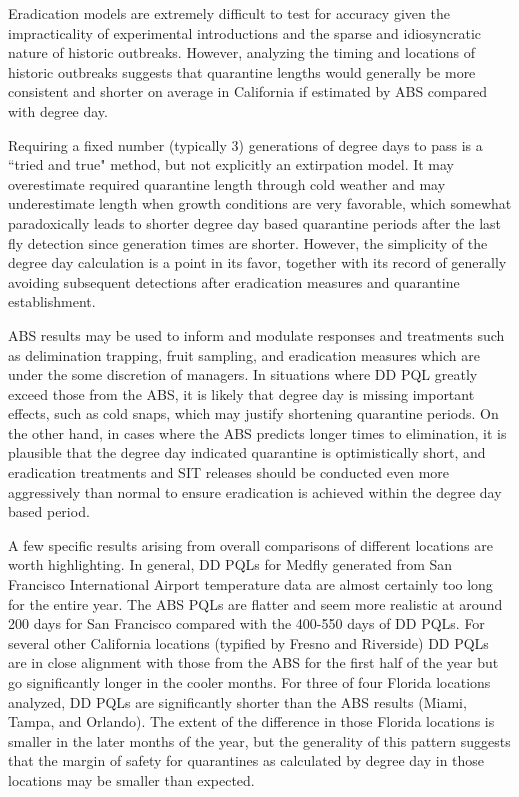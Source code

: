 \documentclass[10pt,a4paper,twocolumn]{article}
\begin{document}

Eradication models are extremely difficult to test for accuracy given 
the impracticality of experimental introductions and 
the sparse and idiosyncratic nature of historic outbreaks.
However, analyzing the timing and locations of historic outbreaks 
suggests that quarantine lengths would generally be more consistent
and shorter on average in California if estimated by ABS compared with degree day. 

Requiring a fixed number (typically 3) generations of degree days to pass is 
a ``tried and true" method, but not explicitly an extirpation model.
It may overestimate required quarantine length through cold weather\cite{manoukis_agent-based_2014}
and may underestimate length when growth conditions are very favorable, 
which somewhat paradoxically leads to shorter degree day based quarantine periods after the 
last fly detection since generation times are shorter. %
However, the simplicity of the degree day calculation is a point in its favor, together with 
its record of generally avoiding subsequent detections after
eradication measures and quarantine establishment\cite{mcinnis2017can}.

ABS results may be used to inform and modulate responses and treatments such as
delimination trapping, fruit sampling, and eradication measures which are under
the some discretion of managers.
In situations where DD PQL greatly exceed those from the ABS, it is likely
that degree day is missing important effects, such as cold snaps, which may justify
shortening quarantine periods.
On the other hand, in cases where the ABS predicts longer times to elimination, it
is plausible that the degree day indicated quarantine is optimistically short, and 
eradication treatments and SIT releases should be conducted even more aggressively than
normal to ensure eradication is achieved within the degree day based period. %


A few specific results arising from overall comparisons of different locations are worth highlighting. 
In general, DD PQLs for Medfly 
generated from San Francisco International Airport temperature data
 are almost certainly too long for the entire year.
The ABS PQLs are flatter and seem more realistic at around 200 days for San
Francisco compared with the 400-550 days of DD PQLs. 
For several other California locations (typified by Fresno and 
Riverside) DD PQLs are in close alignment with those from the ABS 
for the first half of the year 
but go significantly longer in the cooler months. 
For three of four Florida locations analyzed, 
DD PQLs are significantly shorter than the ABS results
 (Miami, Tampa, and Orlando).
The extent of the difference in those Florida locations is smaller in the later months of the year,
but the generality of this pattern suggests that the margin of safety for quarantines as 
calculated by degree day in those locations may be smaller than expected. 
\end{document}
